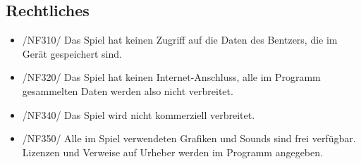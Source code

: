 \subsection{Rechtliches}
\begin{itemize}
\item /NF310/ Das Spiel hat keinen Zugriff auf die Daten des Bentzers, die im Gerät gespeichert sind.
\item /NF320/ Das Spiel hat keinen Internet-Anschluss, alle im Programm gesammelten Daten werden also nicht verbreitet.
\item /NF340/ Das Spiel wird nicht kommerziell verbreitet.
\item /NF350/ Alle im Spiel verwendeten Grafiken und Sounds sind frei verfügbar. Lizenzen und Verweise auf Urheber werden im Programm angegeben.
\end{itemize}